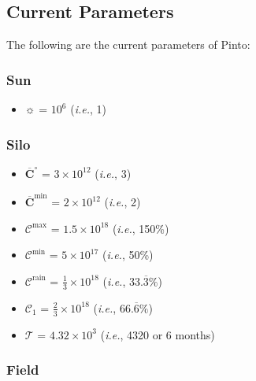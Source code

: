 \documentclass[class=article, crop=false]{standalone}
\begin{document}

\subsection{Current Parameters}

The following are the current parameters of Pinto:


\subsubsection{Sun}

\begin{itemize}[topsep=0pt, itemsep=3pt,leftmargin=16pt]
    \item $\sun$ = $10^{6}$ (\textit{i.e.}, 1)
\end{itemize}


\subsubsection{Silo}

\begin{itemize}[topsep=0pt, itemsep=3pt,leftmargin=16pt]
    \item $\overline{\mathbf{C}}^{\circ}$ = $3 \times 10^{12}$ (\textit{i.e.}, 3)
    \item $\overline{\mathbf{C}}^{\text{min}}$ = $2 \times 10^{12}$ (\textit{i.e.}, 2)
    \item $\mathscr{C}^{\text{max}}$ = $1.5 \times 10^{18}$ (\textit{i.e.}, 150\%)
    \item $\mathscr{C}^{\text{min}}$ = $5 \times 10^{17}$ (\textit{i.e.}, 50\%)
    \item $\mathscr{C}^{\text{rain}}$ = $\frac{1}{3} \times 10^{18}$ (\textit{i.e.}, 33.$\overline{3}\%$)
    \item $\mathscr{C}_{1}$ = $\frac{2}{3} \times 10^{18}$ (\textit{i.e.}, 66.$\overline{6}\%$)
    \item $\mathscr{T}$ = $4.32 \times 10^{3}$ (\textit{i.e.}, 4320  or 6 months)
\end{itemize}


\subsubsection{Field}
\end{document}

